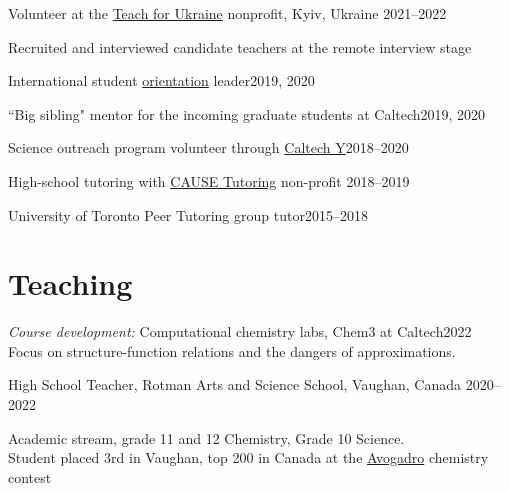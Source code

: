 \documentclass[margin,line]{res}
\newenvironment{list1}{
  \begin{list}{\ding{113}}{%
      \setlength{\itemsep}{0in}
      \setlength{\parsep}{0in} \setlength{\parskip}{0in}
      \setlength{\topsep}{0in} \setlength{\partopsep}{0in} 
      \setlength{\leftmargin}{0.17in}}}{\end{list}}
\begin{document}
\begin{resume}
\vspace{-0.3cm}

Volunteer at the \href{https://teachforukraine.org/en/}{Teach for Ukraine} nonprofit, Kyiv, Ukraine \hfill{2021--2022}

\begin{list1}
\item[]Recruited and interviewed candidate teachers at the remote interview stage
\end{list1}

\vspace{-0.3cm}

International student \href{https://international.caltech.edu/Orientation/isp}{orientation} leader\hfill{2019, 2020}

\vspace{-0.3cm}

``Big sibling" mentor for the incoming graduate students at Caltech\hfill{2019, 2020}

\vspace{-0.3cm}

Science outreach program volunteer through \href{https://www.caltechy.org/student-opportunities}{Caltech Y}\hfill{2018--2020}

\vspace{-0.3cm}

High-school tutoring with \href{https://www.facebook.com/CauseTutoring/?locale=zh_CN&paipv=0&eav=AfapFTOSVzUFy0ircWljNcf8AswCiGwIsBsPs-au8kmxfK99t_d4mxVNzcEVvxME7Jw&_rdr}{CAUSE Tutoring} non-profit \hfill{2018--2019}

\vspace{-0.3cm}

University of Toronto Peer Tutoring group tutor\hfill{2015--2018}

\section{\sc Teaching}
{\em Course development:} Computational chemistry labs, Chem3 at Caltech\hfill{2022}\\
Focus on structure-function relations and the dangers of approximations.

\vspace{-0.3cm}

High School Teacher, Rotman Arts and Science School, Vaughan, Canada \hfill{2020--2022}

\begin{list1}

\item[] Academic stream, grade 11 and 12 Chemistry, Grade 10 Science. \\
Student placed 3rd in Vaughan, top 200 in Canada at the \href{https://uwaterloo.ca/chemistry/community-outreach/chemistry-high-school-exams}{Avogadro} chemistry contest
\end{list1}


\end{resume}
\end{document}
